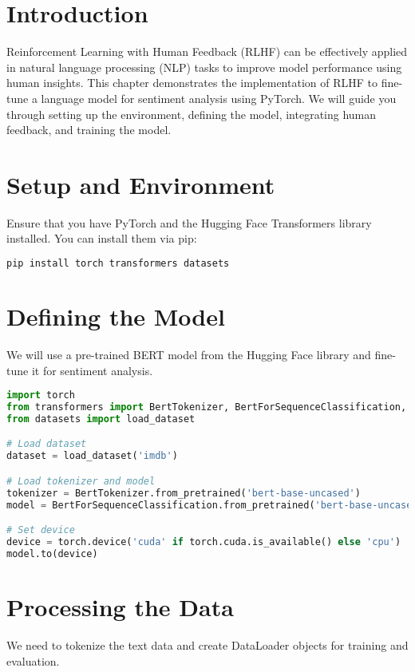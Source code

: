 \section{Introduction}
Reinforcement Learning with Human Feedback (RLHF) can be effectively applied in natural language processing (NLP) tasks to improve model performance using human insights. This chapter demonstrates the implementation of RLHF to fine-tune a language model for sentiment analysis using PyTorch. We will guide you through setting up the environment, defining the model, integrating human feedback, and training the model.

\section{Setup and Environment}
Ensure that you have PyTorch and the Hugging Face Transformers library installed. You can install them via pip:

\begin{lstlisting}[language=bash]
pip install torch transformers datasets
\end{lstlisting}

\section{Defining the Model}
We will use a pre-trained BERT model from the Hugging Face library and fine-tune it for sentiment analysis.

\begin{lstlisting}[language=python]
import torch
from transformers import BertTokenizer, BertForSequenceClassification, AdamW
from datasets import load_dataset

# Load dataset
dataset = load_dataset('imdb')

# Load tokenizer and model
tokenizer = BertTokenizer.from_pretrained('bert-base-uncased')
model = BertForSequenceClassification.from_pretrained('bert-base-uncased', num_labels=2)

# Set device
device = torch.device('cuda' if torch.cuda.is_available() else 'cpu')
model.to(device)
\end{lstlisting}

\section{Processing the Data}
We need to tokenize the text data and create DataLoader objects for training and evaluation.

